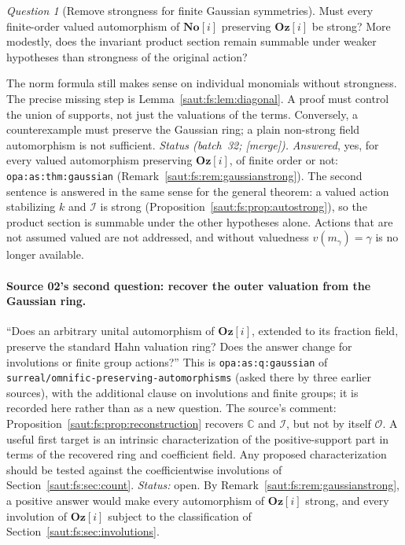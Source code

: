 \documentclass[11pt]{article}
\theoremstyle{definition}
\theoremstyle{remark}
\newtheorem{question}[theorem]{Question}
\newcommand{\No}{\mathbf{No}}
\newcommand{\C}{\mathbb C}
\newcommand{\OO}{\mathcal O}
\newcommand{\repo}[1]{\nolinkurl{#1}}%
\newcommand{\lbl}[1]{\nolinkurl{#1}}%
\newcommand{\Oz}{\mathbf{Oz}}
\newcommand{\Ineg}{\mathcal I}
\newcommand{\mergetag}{\textup{[merge]}}
\numberwithin{equation}{section}
\begin{document}
\begin{question}[Remove strongness for finite Gaussian symmetries]\label{saut:fs:q:strong}
Must every finite-order valued automorphism of $\No[i]$ preserving $\Oz[i]$ be strong?
More modestly, does the invariant product section remain summable under weaker
hypotheses than strongness of the original action?
\end{question}
The norm formula still makes sense on individual monomials without strongness. The
precise missing step is Lemma~\ref{saut:fs:lem:diagonal}. A proof must control the
union of supports, not just the valuations of the terms. Conversely, a counterexample
must preserve the Gaussian ring; a plain non-strong field automorphism is not
sufficient. \emph{Status (batch~32; \mergetag).} \emph{Answered}, yes, for every valued
automorphism preserving $\Oz[i]$, of finite order or not: \lbl{opa:as:thm:gaussian}
(Remark~\ref{saut:fs:rem:gaussianstrong}). The second sentence is answered in the same
sense for the general theorem: a valued action stabilizing $k$ and $\Ineg$ is strong
(Proposition~\ref{saut:fs:prop:autostrong}), so the product section is summable under
the other hypotheses alone. Actions that are not assumed valued are not addressed, and
without valuedness $v(m_\gamma)=\gamma$ is no longer available.

\paragraph{Source 02's second question: recover the outer valuation from the Gaussian ring.}
``Does an arbitrary unital automorphism of $\Oz[i]$, extended to its fraction field,
preserve the standard Hahn valuation ring? Does the answer change for involutions or
finite group actions?'' This is \lbl{opa:as:q:gaussian} of
\repo{surreal/omnific-preserving-automorphisms} (asked there by three earlier sources),
with the additional clause on involutions and finite groups; it is recorded here
rather than as a new question. The source's comment:
Proposition~\ref{saut:fs:prop:reconstruction} recovers $\C$ and $\Ineg$, but not by
itself $\OO$. A useful first target is an intrinsic characterization of the
positive-support part in terms of the recovered ring and coefficient field. Any
proposed characterization should be tested against the coefficientwise involutions of
Section~\ref{saut:fs:sec:count}. \emph{Status:} open. By
Remark~\ref{saut:fs:rem:gaussianstrong}, a positive answer would make every
automorphism of $\Oz[i]$ strong, and every involution of $\Oz[i]$ subject to the
classification of Section~\ref{saut:fs:sec:involutions}.
\end{document}
